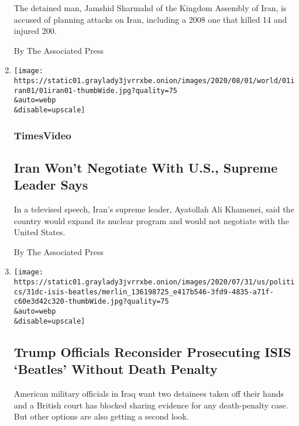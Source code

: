 \begin{enumerate}
  The detained man, Jamshid Sharmahd of the Kingdom Assembly of Iran, is
  accused of planning attacks on Iran, including a 2008 one that killed
  14 and injured 200.

  By The Associated Press
\item
  \href{/video/world/middleeast/100000007268443/iran-united-states-nuclear-program-negotiation.html}{}

  \texttt{[image: https://static01.graylady3jvrrxbe.onion/images/2020/08/01/world/01iran01/01iran01-thumbWide.jpg?quality=75\\\&auto=webp\\\&disable=upscale]}

  \hypertarget{timesvideo}{%
  \subsubsection{TimesVideo}\label{timesvideo}}

  \hypertarget{iran-wont-negotiate-with-us-supreme-leader-says}{%
  \subsection{Iran Won't Negotiate With U.S., Supreme Leader
  Says}\label{iran-wont-negotiate-with-us-supreme-leader-says}}

  In a televised speech, Iran's supreme leader, Ayatollah Ali Khamenei,
  said the country would expand its nuclear program and would not
  negotiate with the United States.

  By The Associated Press
\item
  \href{/2020/07/31/world/middleeast/isis-beatles-hostages.html}{}

  \texttt{[image: https://static01.graylady3jvrrxbe.onion/images/2020/07/31/us/politics/31dc-isis-beatles/merlin\_136198725\_e417b546-3fd9-4835-a71f-c60e3d42c320-thumbWide.jpg?quality=75\\\&auto=webp\\\&disable=upscale]}

  \hypertarget{trump-officials-reconsider-prosecuting-isis-beatles-without-death-penalty}{%
  \subsection{Trump Officials Reconsider Prosecuting ISIS `Beatles'
  Without Death
  Penalty}\label{trump-officials-reconsider-prosecuting-isis-beatles-without-death-penalty}}

  American military officials in Iraq want two detainees taken off their
  hands and a British court has blocked sharing evidence for any
  death-penalty case. But other options are also getting a second look.


\end{enumerate}
